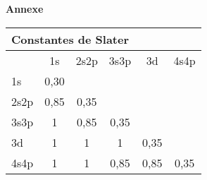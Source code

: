 \begin{center}
\vspace*{10cm}
\textbf{\Huge Annexe}
\end{center}

\clearpage

\vspace*{10cm}

{\large
\begin{center}
\begin{tabular}{l|ccccc}
\multicolumn{6}{l}{\bf Constantes de Slater}\\
\hline
      & 1s   &  2s2p  &   3s3p &   3d  &  4s4p \\
\hline
1s    & 0,30 &        &        &       &       \\
2s2p  & 0,85 &  0,35  &        &       &       \\
3s3p  & 1    &  0,85  &   0,35 &       &       \\
3d    & 1    &  1     &   1    &   0,35&       \\
4s4p  & 1    &  1     &   0,85 &   0,85&   0,35\\
\hline
\end{tabular}
\end{center}
}

%
%

